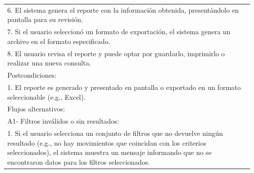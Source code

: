 \documentclass[stu, 12pt, letterpaper, donotrepeattitle, floatsintext, natbib]{apa7}
\begin{document}
\begin{longtable}{@{} p{16.5cm} @{}}
    6. El sistema genera el reporte con la informaci\'on obtenida, present\'andolo en pantalla para su revisi\'on.                                                                                                                                                                   \\
    7. Si el usuario seleccion\'o un formato de exportaci\'on, el sistema genera un archivo en el formato especificado.                                                                                                                                                              \\
    8. El usuario revisa el reporte y puede optar por guardarlo, imprimirlo o realizar una nueva consulta.                                                                                                                                                                           \\ \midrule
    Postcondiciones:                                                                                                                                                                                                                                                                 \\
    1. El reporte es generado y presentado en pantalla o exportado en un formato seleccionable (e.g., Excel).                                                                                                                                                                        \\ \midrule
    Flujos alternativos:                                                                                                                                                                                                                                                             \\
    A1- Filtros inv\'alidos o sin resultados:                                                                                                                                                                                                                                        \\
    \hspace{1cm}1. Si el usuario selecciona un conjunto de filtros que no devuelve ning\'un resultado (e.g., no hay movimientos que coincidan con los criterios seleccionados), el sistema muestra un mensaje informando que no se encontraron datos para los filtros seleccionados. \\

\end{longtable}
\end{document}
